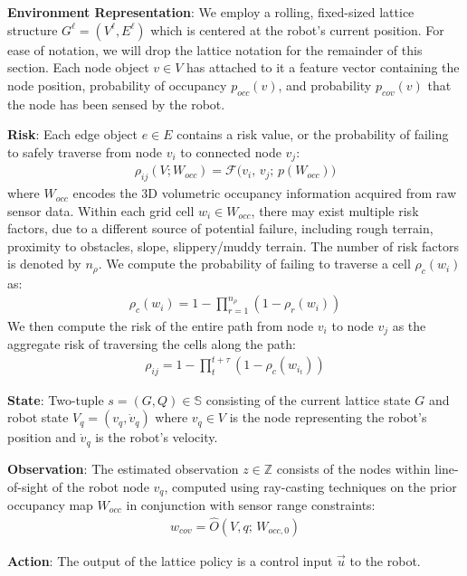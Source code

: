 \documentclass[letterpaper]{article} %
\newcommand{\ph}[1]{{\textbf{#1}:}} %
\begin{document}
\ph{Environment Representation} We employ a rolling, fixed-sized lattice structure $G^\ell = (V^\ell, E^\ell)$ which is centered at the robot's current position. For ease of notation, we will drop the lattice notation for the remainder of this section. Each node object $v \in V$ has attached to it a feature vector containing the node position, probability of occupancy $p_{occ}(v)$, and probability $p_{cov}(v)$ that the node has been sensed by the robot. 

\ph{Risk} Each edge object $e \in E$ contains a risk value, or the probability of failing to safely traverse from node $v_i$ to connected node $v_j$:
\begin{align}
    \rho_{ij}(V; W_{occ}) = \mathcal{F} \big(v_i, \, v_j; \, p(W_{occ})\big)
\end{align}
where $W_{occ}$ encodes the 3D volumetric occupancy information acquired from raw sensor data. Within each grid cell $w_i \in W_{occ}$, there may exist multiple risk factors, due to a different source of potential failure, including rough terrain, proximity to obstacles, slope, slippery/muddy terrain. The number of risk factors is denoted by $n_\rho$. We compute the probability of failing to traverse a cell $\rho_c(w_i)$ as:
\begin{align}
    \rho_c(w_i) = 1-\prod_{r=1}^{n_\rho} (1-\rho_r(w_i))
\end{align}
We then compute the risk of the entire path from node $v_i$ to node $v_j$ as the aggregate risk of traversing the cells along the path:
\begin{align}
    \rho_{ij} = 1-\prod_t^{t+\tau}(1-\rho_c(w_{i_t}))
\end{align}


\ph{State} Two-tuple $s=(G, Q)  \in \mathbb{S}$ consisting of the current lattice state $G$ and robot state $V_q = (v_q, \dot{v}_q)$ where $v_q \in V$ is the node representing the robot's position and $\dot{v}_q$ is the robot's velocity. 

\ph{Observation} The estimated observation $z \in \mathbb{Z}$ consists of the nodes within line-of-sight of the robot node $v_q$, computed using ray-casting techniques on the prior occupancy map $W_{occ}$ in conjunction with sensor range constraints:
\begin{align}
    w_{cov} = \hat{O}(V, q; \, W_{occ,0}) 
\end{align}

\ph{Action} The output of the lattice policy is a control input $\vec{u}$ to the robot. 
\end{document}
